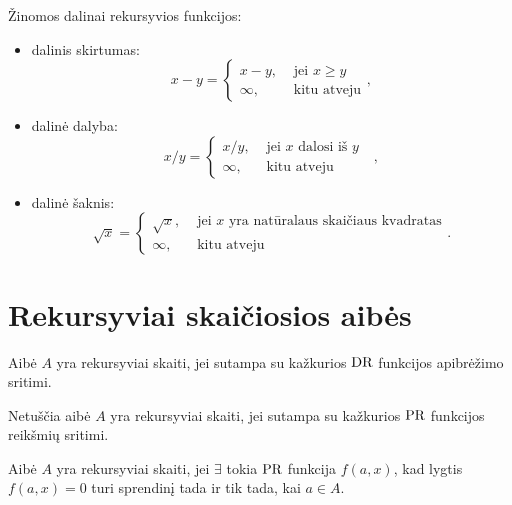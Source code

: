 \begin{note}
  Žinomos dalinai rekursyvios funkcijos:
  \begin{itemize}
    \item dalinis skirtumas:
      \[
      x - y =%
      \begin{cases}
        x - y, & \text{ jei } x \geq y \\
        \infty, & \text{ kitu atveju}
      \end{cases},
      \]
    \item dalinė dalyba:
      \[
      x / y =%
      \begin{cases}
        x / y, & \text{ jei $x$ dalosi iš $y$ }\\
        \infty, & \text{ kitu atveju}
      \end{cases},
      \]
    \item dalinė šaknis:
      \[
      \sqrt{x} =%
      \begin{cases}
        \sqrt{x}, & \text{ jei $x$ yra natūralaus skaičiaus kvadratas} \\
        \infty, & \text{ kitu atveju}
      \end{cases}.
      \]
  \end{itemize}
\end{note}

\section{Rekursyviai skaičiosios aibės}

\begin{defn}
  \label{rsadr}
  Aibė $A$ yra rekursyviai skaiti, jei sutampa su kažkurios $\mathop{\text{DR}}$ funkcijos
  apibrėžimo sritimi.
\end{defn}

\begin{defn}
  \label{rsapr}
  Netuščia aibė $A$ yra rekursyviai skaiti, jei sutampa su kažkurios
  $\mathop{\text{PR}}$ funkcijos reikšmių sritimi.
\end{defn}

\begin{defn}
  \label{rsalg}
  Aibė $A$ yra rekursyviai skaiti, jei $\exists$ tokia $\mathop{\text{PR}}$ funkcija
  $f(a,x)$, kad lygtis $f(a, x) = 0$ turi sprendinį tada ir tik tada, kai
  $a \in A$.
\end{defn}

